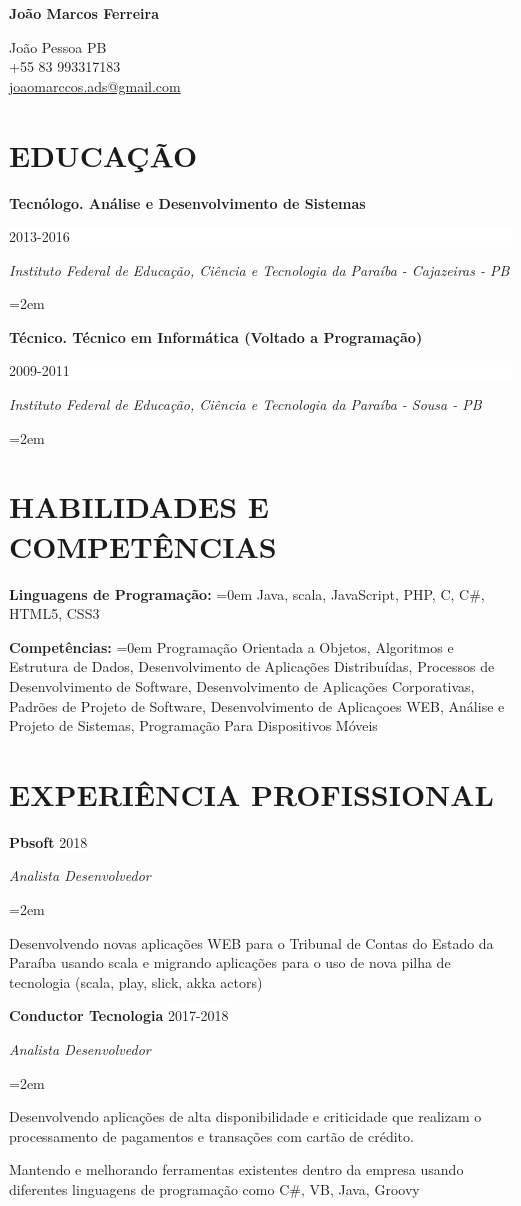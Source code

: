 \documentclass[paper=a4,fontsize=14pt]{article}
\let\olditemize\itemize
\let\endolditemize\enditemize
\renewenvironment{itemize}{%
    \small
    \olditemize
}{%
    \endolditemize
}
\newcommand{\Name}[1]{ 
    \huge \usefont{OT1}{cmr}{b}{n} 
    \textbf{#1} \par \normalsize \normalfont \vspace{.5em}
}
\newcommand{\NewPart}[1]{ \section*{\large \uppercase{#1}}}
\newcommand{\EducationEntry}[4]{
        \noindent \textbf{#1} \hfill            %
        \colorbox{White}{%
            \parbox{6em}{%
            \hfill\color{Black}#2}} \par        %
        \noindent \textit{#3} \par          %
        \noindent\hangindent=2em\hangafter=0 \small #4  %
        \normalsize \par}
\newcommand{\WorkEntry}[4]{                     %
        \noindent \textbf{#1} \hfill                %
        \colorbox{White}{\color{Black}#2} \par          %
        \noindent \textit{#3} \par              %
        \noindent\hangindent=2em\hangafter=0 \small #4      %
        \normalsize \par \vspace*{.5em}}
\newcommand{\Resume}[2]{                        %
        \noindent \textbf{#1: }                 %
        \noindent\hangindent=0em\hangafter=0 \small #2      %
        \normalsize \par \vspace*{.5em}}
\begin{document}
\begin{center}
    \Name{João Marcos Ferreira}
    
 João Pessoa PB\\
    +55 83 993317183\\
    \url{joaomarccos.ads@gmail.com}

\end{center}
\NewPart{Educação}{} 

\EducationEntry{Tecnólogo. Análise e Desenvolvimento de Sistemas}{2013-2016}{Instituto Federal de Educação, Ciência e Tecnologia da Paraíba - Cajazeiras - PB}{}
\EducationEntry{Técnico. Técnico em Informática (Voltado a Programação)}{2009-2011}{Instituto Federal de Educação, Ciência e Tecnologia da Paraíba - Sousa - PB}{}

\NewPart{Habilidades e competências}{}
\Resume{\textbf{Linguagens de Programação}}{Java, scala, JavaScript, PHP, C, C\#, HTML5, CSS3}
\Resume{\textbf{Competências}}{Programação Orientada a Objetos, Algoritmos e Estrutura de Dados, Desenvolvimento de Aplicações Distribuídas, Processos de Desenvolvimento de Software, Desenvolvimento de Aplicações Corporativas, Padrões de Projeto de Software, Desenvolvimento de Aplicaçoes WEB, Análise e Projeto de Sistemas, Programação Para Dispositivos Móveis}  

\NewPart{Experiência Profissional}{}

\WorkEntry{Pbsoft}{2018}{Analista Desenvolvedor}{
\begin{itemize}
    \item Desenvolvendo novas aplicações WEB para o Tribunal de Contas do Estado da Paraíba usando scala e migrando aplicações para o uso de nova pilha de tecnologia (scala, play, slick, akka actors)
\end{itemize}
}

\WorkEntry{Conductor Tecnologia}{2017-2018}{Analista Desenvolvedor}{
\begin{itemize}
    \item Desenvolvendo aplicações de alta disponibilidade e criticidade que realizam o processamento de pagamentos e transações com cartão de crédito. 
    \item Mantendo e melhorando ferramentas existentes dentro da empresa usando diferentes linguagens de programação como C\#, VB, Java, Groovy
\end{itemize}
}
\end{document}
